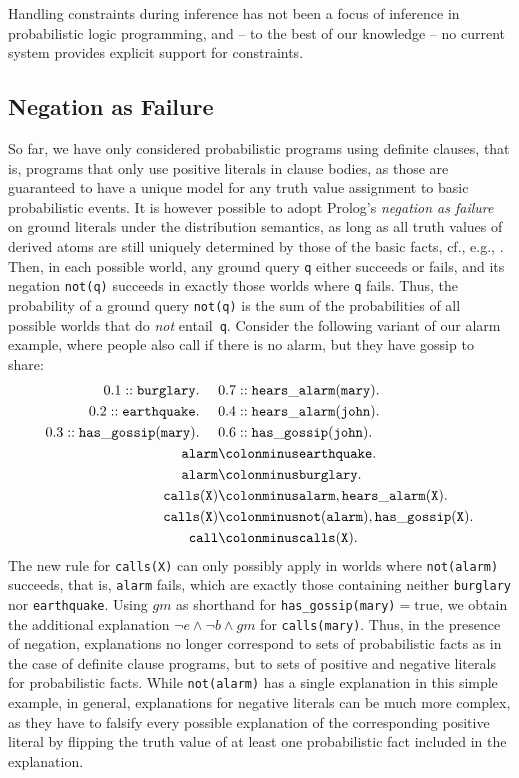 \documentclass[a4paper]{article}
\newcommand{\true}{\ensuremath{\mathrm{true}}}
\begin{document}
Handling constraints during inference has not been a focus of
inference in probabilistic logic programming, and  -- to the best of
our knowledge -- no current system provides explicit support for
constraints. 




\subsection{Negation as Failure} \label{sec:naf}
So far, we have only considered probabilistic programs using definite
clauses, that is, programs that only use positive literals in clause
bodies, as those are guaranteed to have a unique model for any truth
value assignment to basic probabilistic events. It is however possible
to adopt Prolog's \emph{negation as  failure} on ground literals under
the distribution semantics, as long as all truth values of derived
atoms are still uniquely determined by those of the basic facts, 
cf., e.g.,
\citep{Poole00,sato:ijcai05,KimmigSRL09,Riguzzi09,Fierens13}. Then, in
each possible world, any ground query \verb|q| either succeeds or
fails, and its negation \verb|not(q)|  succeeds in exactly those
worlds where \verb|q| fails. Thus, the
probability of a ground query \verb|not(q)| is the sum of the
probabilities of all possible worlds that do \emph{not}
entail~\verb|q|. 
Consider the following variant of our alarm example, where people also
call if there is no alarm, but they have gossip to share:
\begin{align*}
0.1::\mathtt{burglary.} ~~~~&0.7::\mathtt{hears\_alarm(mary).} \\
0.2::\mathtt{earthquake.} ~~~~&0.4::\mathtt{hears\_alarm(john).}\\
0.3::\mathtt{has\_gossip(mary).} ~~~~&0.6::\mathtt{has\_gossip(john).}\\
\mathtt{alarm}&\colonminus\mathtt{earthquake.}\\
\mathtt{alarm}&\colonminus\mathtt{burglary.}\\
\mathtt{calls(X)}&\colonminus\mathtt{alarm, hears\_alarm(X).}\\
\mathtt{calls(X)}&\colonminus\mathtt{not(alarm), has\_gossip(X).}\\
\mathtt{call}&\colonminus\mathtt{calls(X).}
\end{align*}
The new rule for \verb|calls(X)| can only possibly apply in worlds where
\verb|not(alarm)| succeeds, that is, \verb|alarm| fails, which are
exactly those containing neither \verb|burglary| nor
\verb|earthquake|. Using $gm$ as shorthand for
\verb|has_gossip(mary)|$=\true$, we obtain the additional explanation $\neg
e\wedge \neg b \wedge gm$ for
\verb|calls(mary)|. Thus, in the presence of negation, explanations no
longer correspond to sets of probabilistic facts as in the case of
definite clause programs, but to sets of positive and negative
literals for probabilistic facts. 
While \verb|not(alarm)| has a single explanation
in this simple example, in general, explanations for negative literals
can be much more complex, as they have to falsify every possible
explanation of the corresponding positive literal by flipping the
truth value of at least one probabilistic fact included in the
explanation. 
\end{document}
